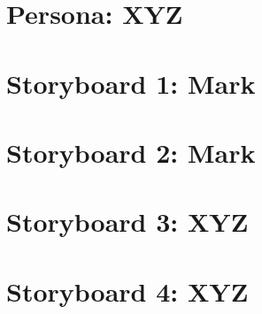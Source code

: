 \documentclass{article}
\begin{document}
\newpage

\section{Persona: XYZ}

\newpage

\section{Storyboard 1: Mark}

\newpage

\section{Storyboard 2: Mark}

\newpage

\section{Storyboard 3: XYZ}

\newpage

\section{Storyboard 4: XYZ}

\newpage
\end{document}
